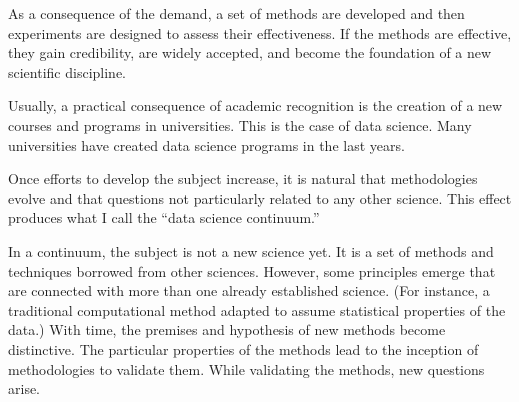 As a consequence of the demand, a set of methods are developed and then experiments are
designed to assess their effectiveness.  If the methods are effective, they gain
credibility, are widely accepted, and become the foundation of a new scientific
discipline.

Usually, a practical consequence of academic recognition is the creation of a new courses
and programs in universities.  This is the case of data science.  Many universities have
created data science programs in the last years.

Once efforts to develop the subject increase, it is natural that methodologies evolve and
that questions not particularly related to any other science.  This effect produces what I
call the ``data science continuum.''

In a continuum, the subject is not a new science yet.  It is a set of methods and
techniques borrowed from other sciences.  However, some principles emerge that are
connected with more than one already established science.  (For instance, a traditional
computational method adapted to assume statistical properties of the data.)  With time,
the premises and hypothesis of new methods become distinctive.  The particular properties
of the methods lead to the inception of methodologies to validate them. While validating
the methods, new questions arise.

